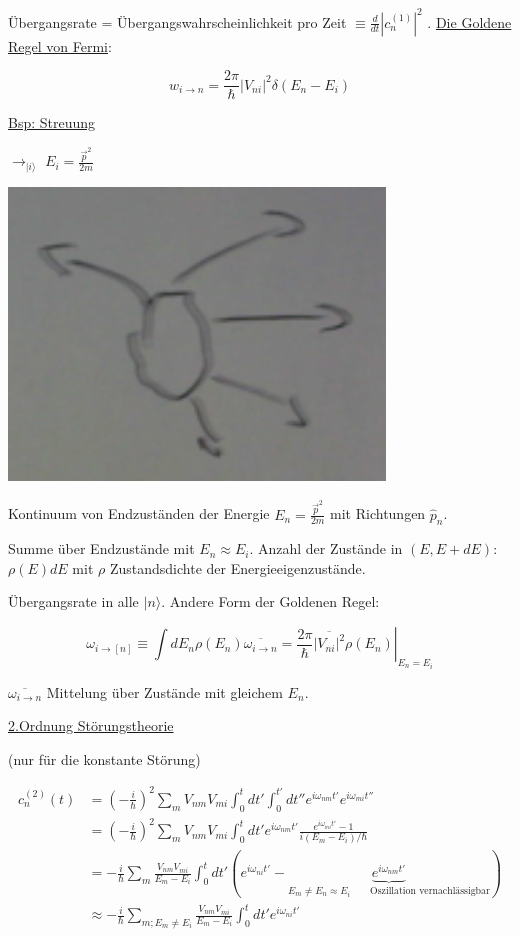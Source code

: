 Übergangsrate = Übergangswahrscheinlichkeit pro Zeit \(\equiv \frac{d}{dt}|c^{(1)}_n|^2\) . \underline{Die Goldene Regel von Fermi}:

\[\boxed{w_{i\rightarrow n} = \frac{2\pi}{\hbar} |V_{ni}|^2 \delta(E_n-E_i)}\]


\underline{Bsp: Streuung}

\(\rightarrow_{|i\rangle }\) \(E_i = \frac{\vec p^2}{2m}\)

\includegraphics[width=0.75\textwidth]{kap03_08.png}

Kontinuum von Endzuständen der Energie \(E_n = \frac{\vec p^2}{2m}\) mit Richtungen \(\hat p_n\).

Summe über Endzustände mit \(E_n \approx E_i\). Anzahl der Zustände in \((E,E+dE)\): \(\rho(E)dE\) mit \(\rho\) Zustandsdichte der Energieeigenzustände.

Übergangsrate in alle \(|n\rangle \). Andere Form der Goldenen Regel:

\[\boxed{\omega_{i\rightarrow [n]} \equiv \int dE_n\rho(E_n)\overline{\omega_{i\rightarrow n}} = \left. \frac{2\pi}{\hbar}\overline{|V_{ni}|^2}\rho(E_n)\right|_{E_n=E_i}}\]

\(\overline{\omega_{i\rightarrow n}}\) Mittelung über Zustände mit gleichem \(E_n\).

\underline{2.Ordnung Störungstheorie}

(nur für die konstante Störung)

\begin{align}
  c^{(2)}_n(t) &= (-\frac{i}{\hbar})^2 \sum_m V_{nm}V_{mi} \int_0^t dt'\int_0^{t'} dt''e^{i\omega_{nm}t'}e^{i\omega_{mi}t''}\\
  &= (-\frac{i}{\hbar})^2 \sum_m V_{nm}V_{mi} \int_0^t dt' e^{i\omega_{nm}t'} \frac{e^{i\omega_{mi}t'}-1}{i(E_m-E_i)/\hbar}\\
  &= -\frac{i}{\hbar}\sum_m \frac{ V_{nm}V_{mi} }{E_m-E_i} \int_0^t dt' (e^{i\omega_{ni}t'}-\underbrace{e^{i\omega_{nm}t'}}_{E_m\neq E_n\approx E_i\qquad\text{Oszillation vernachlässigbar}})\\
  &\approx -\frac{i}{\hbar}\sum_{m; E_m\neq E_i} \frac{ V_{nm}V_{mi} }{E_m-E_i} \int_0^t dt'e^{i\omega_{ni}t'}
\end{align}


